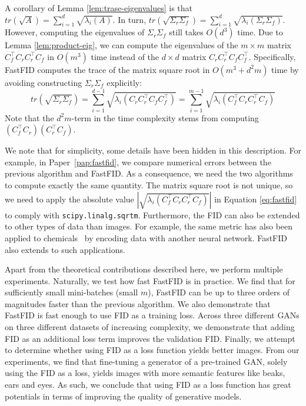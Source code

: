 \documentclass[11pt,a4paper,twoside,openright,final]{memoir}
\newcommand*{\paperref}[1]{Paper~\hyperref[#1]{\ref{#1}}}
\begin{document}
A corollary of Lemma \ref{lem:trase-eigenvalues} is that $tr(\sqrt{A}) = \sum_{i=1}^d \sqrt{\lambda_i(A)}$.
In turn, $tr(\sqrt{\Sigma_r\Sigma_f}) = \sum_{i=1}^d \sqrt{\lambda_i(\Sigma_r\Sigma_f) }$.
However, computing the eigenvalues of $\Sigma_r\Sigma_f$ still takes $O(d^3)$ time.
Due to Lemma \ref{lem:product-eig}, we can compute the eigenvalues of the $m\times m$ matrix $C_f^\intercal C_rC_r^\intercal C_f$ in $O(m^3)$ time instead of the $d\times d$ matrix $C_rC_r^\intercal C_fC_f^\intercal$.
Specifically, FastFID computes the trace of the matrix square root in $O(m^3 + d^2m)$ time by avoiding constructing $\Sigma_r\Sigma_f$ explicitly:
\begin{equation}\label{eq:fastfid}
   tr( \sqrt{\Sigma_r\Sigma_f}) = \sum_{i=1}^{d-1}\sqrt{\lambda_i(C_rC_r^\intercal C_fC_f^\intercal)} = \sum_{i=1}^{m-1} \sqrt{\lambda_i(C_f^\intercal C_rC_r^\intercal C_f)}
\end{equation}
Note that the $d^2m$-term in the time complexity stems from computing $(C_f^\intercal C_r)(C_r^\intercal C_f)$.

We note that for simplicity, some details have been hidden in this description.
For example, in \paperref{pap:fastfid}, we compare numerical errors between the previous algorithm and FastFID.
As a consequence, we need the two algorithms to compute exactly the same quantity.
The matrix square root is not unique, so we need to apply the absolute value $|\sqrt{\lambda_i(C_f^\intercal C_rC_r^\intercal C_f)}|$ in Equation \eqref{eq:fastfid} to comply with \verb^scipy.linalg.sqrtm^.
Furthermore, the FID can also be extended to other types of data than images.
For example, the same metric has also been applied to chemicals~\cite{fcd} by encoding data with another neural network.
FastFID also extends to such applications.

Apart from the theoretical contributions described here, we perform multiple experiments.
Naturally, we test how fast FastFID is in practice.
We find that for sufficiently small mini-batches (small $m$), FastFID can be up to three orders of magnitudes faster than the previous algorithm.
We also demonstrate that FastFID is fast enough to use FID as a training loss.
Across three different GANs on three different datasets of increasing complexity, we demonstrate that adding FID as an additional loss term improves the validation FID.
Finally, we attempt to determine whether using FID as a loss function yields better images.
From our experiments, we find that fine-tuning a generator of a pre-trained GAN, solely using the FID as a loss, yields images with more semantic features like beaks, ears and eyes.
As such, we conclude that using FID as a loss function has great potentials in terms of improving the quality of generative models.
 
\end{document}
